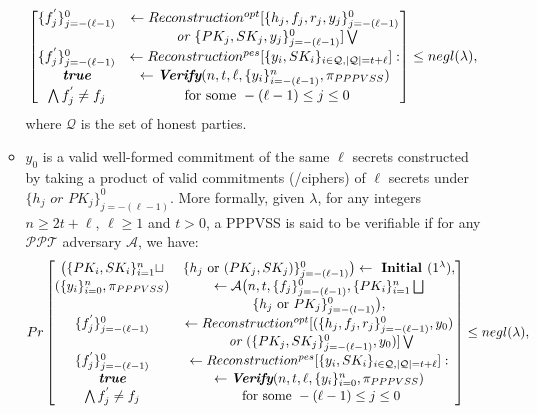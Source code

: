 \begin{itemize}
\begin{itemize}
\begin{align*}
\begin{bmatrix}
            \{f_j^{'}\}_{j=-(\ell-1)}^0&\leftarrow Reconstruction^{opt}[\{h_j,f_j,r_j,y_j\}_{j=-(\ell-1)}^0\\
            &\textit{ or }\{PK_j,SK_j,y_j\}_{j=-(\ell-1)}^0]\bigvee\\
            \{f_j^{'}\}_{j=-(\ell-1)}^0&\leftarrow Reconstruction^{pes}[\{y_i,SK_i\}_{i\in\mathcal{Q},|\mathcal{Q}|=t+\ell}]:\\
            \textit{\textbf{true}}&\leftarrow \textit{\textbf{Verify}} (n,t,\ell,\{y_i\}_{i=-(\ell-1)}^n,\pi_{PPPVSS})\\
            \bigwedge f_j^{'}\neq f_j&\text{ for some }-(\ell-1)\leq j\leq 0
          \end{bmatrix} \leq negl(\lambda),
        \end{align*}
        where $\mathcal{Q}$ is the set of honest parties.
      \item $y_0$ is a valid well-formed commitment of the same $\ell$ secrets constructed by taking a 
        product of valid commitments (/ciphers) of $\ell$ secrets under 
        $\{h_j\textit{ or }PK_j\}_{j=-(\ell-1)}^0$. More formally, given $\lambda$, for any integers 
        $n\geq 2t+\ell$, $\ell\geq 1$ and $t>0$, a PPPVSS is said to be verifiable if for any 
        $\mathcal{PPT}$ adversary $\mathcal{A}$, we have:
        \begin{align*}
          Pr\begin{bmatrix}
            \big(\{PK_i,SK_i\}_{i=1}^n\sqcup&\{h_j\text{ or }(PK_j,SK_j)\}_{j=-(\ell-1)}^0\big)\leftarrow\textbf{ Initial } (1^\lambda),\\
            (\{y_i\}_{i=0}^n,\pi_{PPPVSS})&\leftarrow \mathcal{A} \big(n,t,\{f_j\}_{j=-(\ell-1)}^0,\{PK_i\}_{i=1}^n\bigsqcup\\
            &\{h_j\text{ or }PK_j\}_{j=-(l-1)}^0\big),\\
            \{f_j^{'}\}_{j=-(\ell-1)}^0&\leftarrow Reconstruction^{opt}[(\{h_j,f_j,r_j\}_{j=-(\ell-1)}^0,y_0)\\
            &\textit{ or }(\{PK_j,SK_j\}_{j=-(\ell-1)}^0,y_0)]\bigvee\\
            \{f_j^{'}\}_{j=-(\ell-1)}^0&\leftarrow Reconstruction^{pes}[\{y_i,SK_i\}_{i\in\mathcal{Q},|\mathcal{Q}|=t+\ell}]:\\
            \textit{\textbf{true}}&\leftarrow \textit{\textbf{Verify}} (n,t,\ell,\{y_i\}_{i=0}^n,\pi_{PPPVSS})\\
            \bigwedge f_j^{'}\neq f_j&\text{ for some }-(\ell-1)\leq j\leq 0
          \end{bmatrix} \leq negl(\lambda),

\end{align*}
\end{itemize}
\end{itemize}
